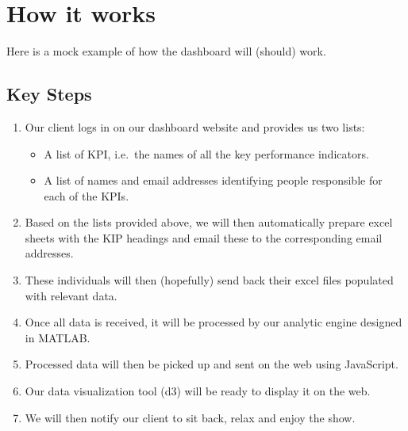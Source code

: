 \documentclass[a4paper]{article}
\begin{document}
\section*{How it works}
Here is a mock example of how the dashboard will (should)
work.

\subsection*{Key Steps}
\begin{enumerate}

\item Our client logs in on our dashboard website and
provides us two lists:
\begin{itemize}
   \item A list of KPI, i.e.\ the names of all the key
   performance indicators.  
   \item A list of names and email addresses identifying
   people responsible for each of the  KPIs.
\end{itemize}

\item Based on the lists provided above, we will then
automatically prepare excel sheets with the KIP headings and
email these to the corresponding email addresses. 

\item These individuals will then (hopefully) send back their excel files
populated with relevant data. 

\item Once all data is received, it will be processed by our
analytic engine designed in MATLAB.

\item Processed data will then be picked up and sent on the
web using JavaScript.

\item Our data visualization tool (d3) will be ready to
display it on the web.

\item We will then notify our client to sit back, relax and
enjoy the show.
\end{enumerate}



\end{document}

